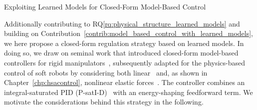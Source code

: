 \begin{contribution}\label{contrib:model_based_control_with_learned_models}
    Exploiting Learned Models for Closed-Form Model-Based Control
\end{contribution}
Additionally contributing to \gls{RQ}\ref{rq:physical_structure_learned_models} and building on Contribution~\ref{contrib:model_based_control_with_learned_models}, we here propose a closed-form regulation strategy based on learned models. In doing so, we draw on seminal work that introduced closed-form model-based controllers for rigid manipulators~\citep{kelly1996class, kelly1997pd, kelly1998global, sciavicco2012modelling}, subsequently adapted for the physics-based control of soft robots by considering both linear~\citep{della2020model, della2023model} and, as shown in Chapter~\ref{chp:hsacontrol}, nonlinear elastic forces~\citep{borja2022energy}.
The controller combines an integral-saturated PID (P-satI-D)~\citep{pustina2022p} with an energy-shaping feedforward term. We motivate the considerations behind this strategy in the following.


